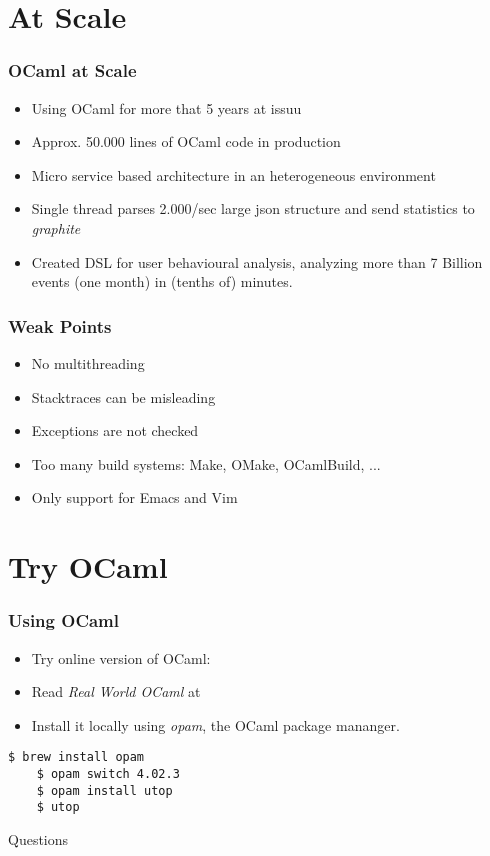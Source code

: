 \documentclass[xcolor=svgnames]{beamer}
\renewcommand{\emph}[1]{{\em #1}}
\renewcommand{\_}{\mathunderscore}
\begin{document}
\section{At Scale}
\begin{frame}[fragile]
  \frametitle{OCaml at Scale}
  \begin{itemize}
  \item Using OCaml for more that 5 years at issuu
  \item Approx. 50.000 lines of OCaml code in production
  \item Micro service based architecture in an heterogeneous environment
  \item Single thread parses 2.000/sec large json structure and send
    statistics to \textit{graphite}
  \item Created DSL for user behavioural analysis, analyzing more than
    7 Billion events (one month) in (tenths of) minutes.
  \end{itemize}
\end{frame}

\begin{frame}[fragile]
  \frametitle{Weak Points}
  \begin{itemize}
  \item No multithreading
  \item Stacktraces can be misleading
  \item Exceptions are not checked
  \item Too many build systems: Make, OMake, OCamlBuild, ...
  \item Only support for Emacs and Vim
  \end{itemize}
\end{frame}

\section{Try OCaml}
\begin{frame}[fragile]
  \frametitle{Using OCaml}
  \begin{itemize}
    \item Try online version of OCaml: 
    \item Read \emph{Real World OCaml} at 
    \item Install it locally using \emph{opam}, the OCaml package mananger.
  \end{itemize}
  \begin{lstlisting}[numbers=none,frame=none]
    $ brew install opam
    $ opam switch 4.02.3
    $ opam install utop
    $ utop
  \end{lstlisting}
\end{frame}

\begin{frame}[fragile]
  \begin{center}
    \LARGE Questions
  \end{center}
\end{frame}
\end{document}
